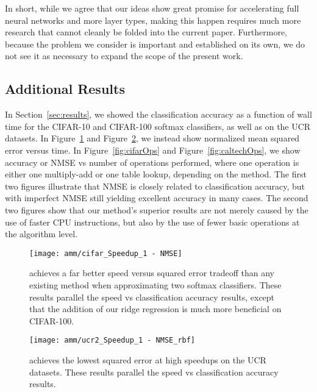 In short, while we agree that our ideas show great promise for accelerating full neural networks and more layer types, making this happen requires much more research that cannot cleanly be folded into the current paper. Furthermore, because the problem we consider is important and established on its own, we do not see it as necessary to expand the scope of the present work.

\subsection{Additional Results}

In Section~\ref{sec:results}, we showed the classification accuracy as a function of wall time for the CIFAR-10 and CIFAR-100 softmax classifiers, as well as on the UCR datasets. In Figure~\ref{fig:cifarNMSE} and Figure~\ref{fig:ucrNMSE}, we instead show normalized mean squared error versus time. In Figure~\ref{fig:cifarOps} and Figure~\ref{fig:caltechOps}, we show accuracy or NMSE vs number of operations performed, where one operation is either one multiply-add or one table lookup, depending on the method. The first two figures illustrate that NMSE is closely related to classification accuracy, but with imperfect NMSE still yielding excellent accuracy in many cases. The second two figures show that our method's superior results are not merely caused by the use of faster CPU instructions, but also by the use of fewer basic operations at the algorithm level.

\begin{figure}[h]
\begin{center}
\texttt{[image: amm/cifar\_Speedup\_1 - NMSE]}
\caption{\oursp achieves a far better speed versus squared error tradeoff than any existing method when approximating two softmax classifiers. These results parallel the speed vs classification accuracy results, except that the addition of our ridge regression is much more beneficial on CIFAR-100.}
\label{fig:cifarNMSE}
\end{center}
\end{figure}

\begin{figure}[h]
\begin{center}
\texttt{[image: amm/ucr2\_Speedup\_1 - NMSE\_rbf]}
\caption{\oursp achieves the lowest squared error at high speedups on the UCR datasets. These results parallel the speed vs classification accuracy results.}
\label{fig:ucrNMSE}
\end{center}
\end{figure}

